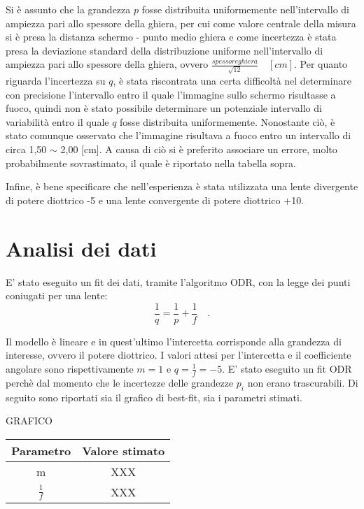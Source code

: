 \documentclass{article}
\begin{document}
    Si è assunto che la grandezza $p$ fosse distribuita uniformemente nell'intervallo di ampiezza pari allo spessore della ghiera, per cui come valore centrale della misura si è presa la distanza schermo - punto medio ghiera e come incertezza è stata presa la deviazione standard della distribuzione uniforme nell'intervallo di ampiezza pari allo spessore della ghiera, ovvero $\frac{spessore ghiera}{\sqrt{12}} \quad [cm]$.
    Per quanto riguarda l'incertezza su $q$, è stata riscontrata una certa difficoltà nel determinare con precisione l'intervallo entro il quale l'immagine sullo schermo risultasse a fuoco, quindi non è stato possibile determinare un potenziale intervallo di variabilità entro il quale $q$ fosse distribuita uniformemente. Nonostante ciò, è stato comunque osservato che l'immagine risultava a fuoco entro un intervallo di circa 1,50 $\sim$ 2,00 [cm]. A causa di ciò si è preferito associare un errore, molto probabilmente sovrastimato, il quale è riportato nella tabella sopra. 
    
    Infine, è bene specificare che nell'esperienza è stata utilizzata una lente divergente di potere diottrico -5 e una lente convergente di potere diottrico +10.
    
    
	\section{Analisi dei dati}
	E' stato eseguito un fit dei dati, tramite l'algoritmo ODR, con la legge dei punti coniugati per una lente:
	\begin{equation}
	\frac{1}{q} = \frac{1}{p} + \frac{1}{f} \quad.
	\end{equation}
	
	Il modello è lineare e in quest'ultimo l'intercetta corrisponde alla grandezza di interesse, ovvero il potere diottrico. I valori attesi per l'intercetta e il coefficiente angolare sono rispettivamente $m=1$ e $q= \frac{1}{f} = -5$.
	E' stato eseguito un fit ODR perchè dal momento che le incertezze delle grandezze $p_{i}$ non erano trascurabili.
	Di seguito sono riportati sia il grafico di best-fit, sia i parametri stimati. 
	
	\begin{center}
		
    GRAFICO
    \end{center}
	
	\begin{center}
	\begin{tabular}{cc}
		\hline
		Parametro & Valore stimato \\
		\hline
	m	&  XXX\\
	$\frac{1}{f}$	& XXX \\
		\hline
	\end{tabular}
	\end{center}
	
\end{document}
